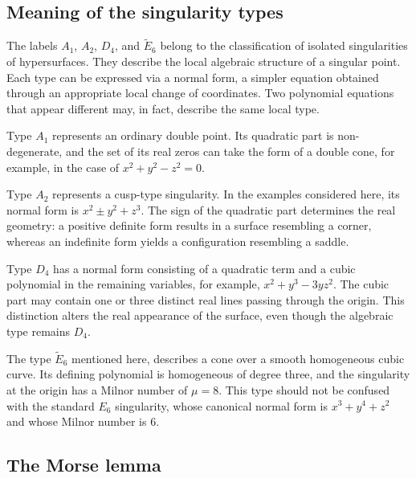 \documentclass[12pt, a4paper]{article}
\theoremstyle{plain}
\theoremstyle{definition}
\theoremstyle{remark}
\theoremstyle{definition}
\begin{document}
\subsection{Meaning of the singularity types}

The labels $A_1$, $A_2$, $D_4$, and $\widetilde E_6$ belong to the classification of isolated singularities of hypersurfaces.
They describe the local algebraic structure of a singular point. 
Each type can be expressed via a normal form, a simpler equation obtained through an appropriate local change of coordinates. 
Two polynomial equations that appear different may, in fact, describe the same local type.

Type $A_1$ represents an ordinary double point. 
Its quadratic part is non-degenerate, and the set of its real zeros can take the form of a double cone, for example, in the case of $x^2+y^2-z^2=0$.

Type $A_2$ represents a cusp-type singularity. 
In the examples considered here, its normal form is $x^2 \pm y^2 + z^3$. 
The sign of the quadratic part determines the real geometry: a positive definite form results in a surface resembling a corner, whereas an indefinite form yields a configuration resembling a saddle.

Type $D_4$ has a normal form consisting of a quadratic term and a cubic polynomial in the remaining variables, for example, $x^2+y^3-3yz^2$. 
The cubic part may contain one or three distinct real lines passing through the origin. 
This distinction alters the real appearance of the surface, even though the algebraic type remains $D_4$.

The type $\widetilde E_6$ mentioned here, describes a cone over a smooth homogeneous cubic curve. 
Its defining polynomial is homogeneous of degree three, and the singularity at the origin has a Milnor number of $\mu=8$. 
This type should not be confused with the standard $E_6$ singularity, whose canonical normal form is $x^3+y^4+z^2$ and whose Milnor number is $6$.


\subsection{The Morse lemma}
\end{document}
